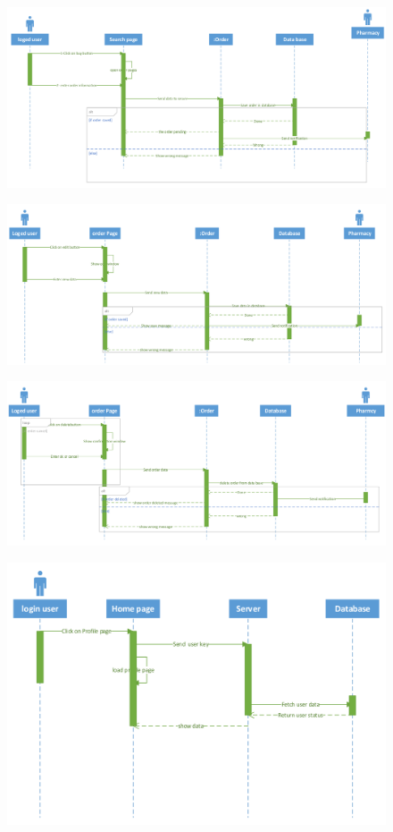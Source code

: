 \documentclass[]{article}
\begin{document}
\begin{figure}[H]
\centering
\includegraphics[scale=0.28]{./sequence/14}
\end{figure}
\begin{figure}[H]
\centering
\includegraphics[scale=0.25]{./sequence/15}
\end{figure}
\begin{figure}[H]
\centering
\includegraphics[scale=0.25]{./sequence/16}
\end{figure}
\begin{figure}[H]
\centering
\includegraphics[scale=0.3]{./sequence/17}
\end{figure}
\end{document}
